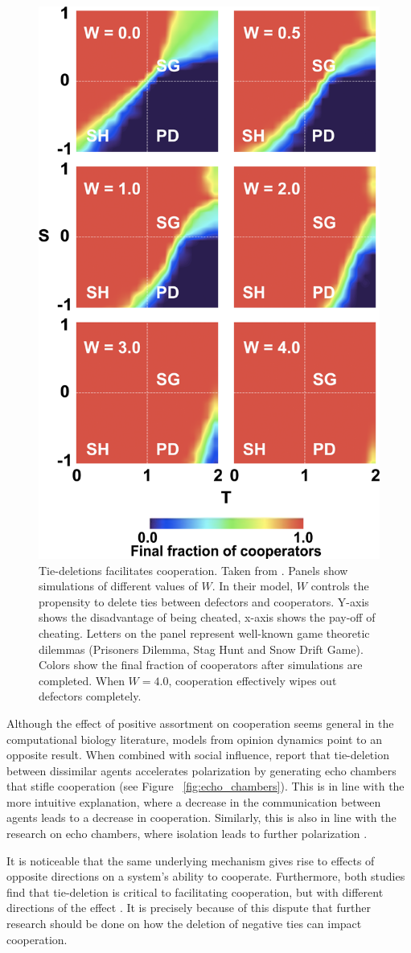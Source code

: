\documentclass[11pt]{article}
\begin{document}
\begin{figure}[H]
    \centering
    \includegraphics[width=.4\linewidth]{../plots/references/santos.png}
  \caption{Tie-deletions facilitates cooperation. Taken from \protect\citeauthor{santos_cooperation_2006} \protect\citeyear{santos_cooperation_2006}. Panels show simulations of different values of $W$. In their model, $W$ controls the propensity to delete ties between defectors and cooperators. Y-axis shows the disadvantage of being cheated, x-axis shows the pay-off of cheating. Letters on the panel represent well-known game theoretic dilemmas (Prisoners Dilemma, Stag Hunt and Snow Drift Game). Colors show the final fraction of cooperators after simulations are completed. When $W = 4.0$, cooperation effectively wipes out defectors completely. }
  \label{fig:santos}
\end{figure}

\noindent Although the effect of positive assortment on cooperation seems general in the computational biology literature, models from opinion dynamics point to an opposite result. When combined with social influence,  report that tie-deletion between dissimilar agents accelerates polarization by generating echo chambers that stifle cooperation (see Figure ~\ref{fig:echo_chambers}). This is in line with the more intuitive explanation, where a decrease in the communication between agents leads to a decrease in cooperation. Similarly, this is also in line with the research on echo chambers, where isolation leads to further polarization \cite{tsai_echo_2020, del_vicario_echo_2016}. 

\noindent It is noticeable that the same underlying mechanism gives rise to effects of opposite directions on a system's ability to cooperate. Furthermore, both studies find that tie-deletion is critical to facilitating cooperation, but with different directions of the effect  \cite{santos_cooperation_2006,sasahara_social_2021}. It is precisely because of this dispute that further research should be done on how the deletion of negative ties can impact cooperation.
\end{document}
